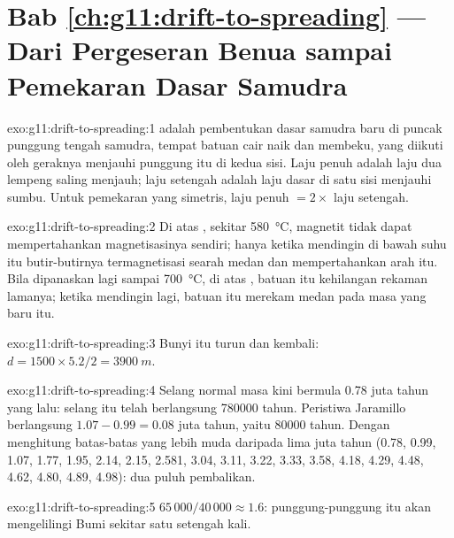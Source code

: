 \section*{Bab \ref{ch:g11:drift-to-spreading} --- Dari Pergeseran Benua sampai Pemekaran Dasar Samudra}

\begin{solution}{exo:g11:drift-to-spreading:1}
 adalah pembentukan dasar samudra baru di puncak
punggung tengah samudra, tempat batuan cair naik dan membeku, yang diikuti
oleh geraknya menjauhi punggung itu di kedua sisi. Laju penuh adalah laju dua
lempeng saling menjauh; laju setengah adalah laju dasar di satu sisi menjauhi
sumbu. Untuk pemekaran yang simetris, laju penuh $= 2
\times$ laju setengah.
\end{solution}

\begin{solution}{exo:g11:drift-to-spreading:2}
Di atas , sekitar \qty{580}{\celsius}, magnetit tidak dapat
mempertahankan magnetisasinya sendiri; hanya ketika mendingin di bawah suhu itu
butir-butirnya termagnetisasi searah medan dan mempertahankan arah itu. Bila
dipanaskan lagi sampai \qty{700}{\celsius}, di atas , batuan itu
kehilangan rekaman lamanya; ketika mendingin lagi, batuan itu merekam medan
pada masa yang baru itu.
\end{solution}

\begin{solution}{exo:g11:drift-to-spreading:3}
Bunyi itu turun dan kembali: $d = 1500 \times 5.2/2 = \qty{3900}{m}$.
\end{solution}

\begin{solution}{exo:g11:drift-to-spreading:4}
Selang normal masa kini bermula \num{0.78} juta tahun yang lalu: selang itu
telah berlangsung \num{780000} tahun. Peristiwa Jaramillo berlangsung
$1.07 - 0.99 = \num{0.08}$ juta tahun, yaitu \num{80000} tahun. Dengan
menghitung batas-batas yang lebih muda daripada lima juta tahun (0.78, 0.99,
1.07, 1.77, 1.95, 2.14, 2.15, 2.581, 3.04, 3.11, 3.22, 3.33, 3.58, 4.18, 4.29,
4.48, 4.62, 4.80, 4.89, 4.98): dua puluh pembalikan.
\end{solution}

\begin{solution}{exo:g11:drift-to-spreading:5}
$65\,000/40\,000 \approx 1.6$: punggung-punggung itu akan mengelilingi Bumi
sekitar satu setengah kali.
\end{solution}

